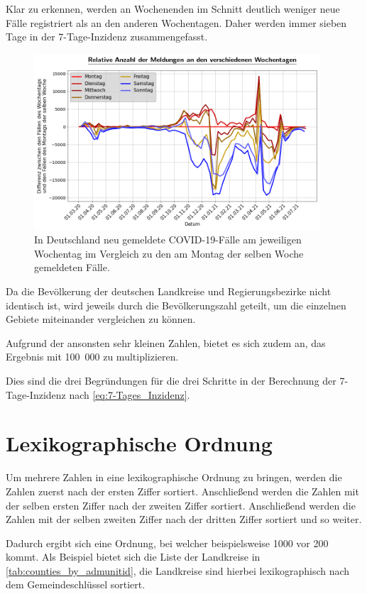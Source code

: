 Klar zu erkennen, werden an Wochenenden im Schnitt deutlich weniger neue Fälle registriert als an den anderen Wochentagen.
Daher werden immer sieben Tage in der 7-Tage-Inzidenz zusammengefasst.
\begin{figure}[H]
    \centering
    \includegraphics[width=0.95\textwidth]{figures/Grundlagen/neue_Fälle_pro_Wochentag_Deutschland.png}
    \caption{In Deutschland neu gemeldete COVID-19-Fälle am jeweiligen Wochentag im Vergleich zu den am Montag der selben Woche gemeldeten Fälle.}
    \label{fig:neue_Fälle_pro_Wochentag_Deutschland}
\end{figure}
Da die Bevölkerung der deutschen Landkreise und Regierungsbezirke nicht identisch ist, wird jeweils durch die Bevölkerungszahl geteilt, um die einzelnen Gebiete miteinander vergleichen zu können.

Aufgrund der ansonsten sehr kleinen Zahlen, bietet es sich zudem an, das Ergebnis mit 100~000 zu multiplizieren.

Dies sind die drei Begründungen für die drei Schritte in der Berechnung der 7-Tage-Inzidenz nach \autoref{eq:7-Tages_Inzidenz}.

\section{Lexikographische Ordnung}
Um mehrere Zahlen in eine lexikographische Ordnung zu bringen, werden die Zahlen zuerst nach der ersten Ziffer sortiert. Anschließend werden die Zahlen mit der selben ersten Ziffer nach der zweiten Ziffer sortiert. Anschließend werden die Zahlen mit der selben zweiten Ziffer nach der dritten Ziffer sortiert und so weiter.

Dadurch ergibt sich eine Ordnung, bei welcher beispielsweise 1000 vor 200 kommt. Als Beispiel bietet sich die Liste der Landkreise in \autoref{tab:counties_by_admunitid}, die Landkreise sind hierbei lexikographisch nach dem Gemeindeschlüssel sortiert.
